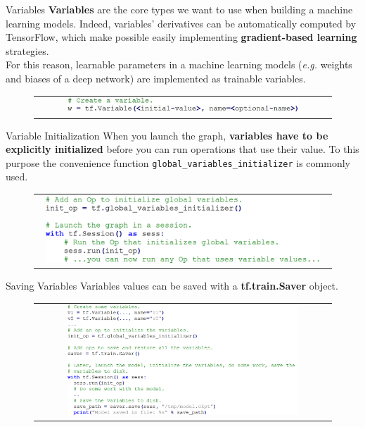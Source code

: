 \documentclass[aspectratio=169]{beamer}
\begin{document}
\begin{frame}{Variables}
\textbf{Variables} are the core types we want to use when building a machine learning models. Indeed, variables' derivatives can be automatically computed by TensorFlow, which make possible easily implementing \textbf{gradient-based learning} strategies.\\
\vspace{0.5cm}
For this reason, learnable parameters in a machine learning models (\textit{e.g.} weights and biases of a deep network) are implemented as trainable variables.
\begin{figure}
\begin{tabular}{c}
\includegraphics[width=0.8\textwidth]{img/tf/variable_creation.jpg}
\end{tabular}
\end{figure}
\end{frame}


\begin{frame}{Variable Initialization}
When you launch the graph, \textbf{variables have to be explicitly initialized} before you can run operations that use their value. To this purpose the convenience function \texttt{global\_variables\_initializer} is commonly used.
\begin{figure}
\begin{tabular}{c}
\includegraphics[width=0.95\textwidth]{img/tf/variable_initialization.png}
\end{tabular}
\end{figure}
\end{frame}


\begin{frame}{Saving Variables}
Variables values can be saved with a \textbf{tf.train.Saver} object.
\begin{figure}
\begin{tabular}{c}
\includegraphics[width=0.8\textwidth]{img/tf/save_variables.png}
\end{tabular}
\end{figure}
\end{frame}
\end{document}
